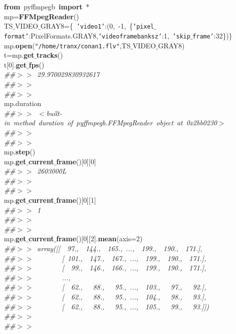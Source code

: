\noindent
\mbox{}\textbf{from}\ pyffmpegb\ \textbf{import}\ * \\
\mbox{}mp=\textbf{FFMpegReader}() \\
\mbox{}TS$\_$VIDEO$\_$GRAY8=\{\ \texttt{'video1'}:(0,\ -1,\ \{\texttt{'pixel$\_$format'}:PixelFormats.GRAY8,\texttt{'videoframebanksz'}:1,\ \texttt{'skip$\_$frame'}:32\})\} \\
\mbox{}mp.\textbf{open}(\texttt{"{}/home/tranx/conan1.flv"{}},TS$\_$VIDEO$\_$GRAY8) \\
\mbox{}t=mp.\textbf{get$\_$tracks}() \\
\mbox{}t[0].\textbf{get$\_$fps}() \\
\mbox{}\textit{\#\#$>$$>$\ 29.970029830932617} \\
\mbox{}\textit{\#\#$>$$>$\ } \\
\mbox{}\textit{\#\#$>$$>$\ } \\
\mbox{}mp.duration \\
\mbox{}\textit{\#\#$>$$>$\ $<$built-in\ method\ duration\ of\ pyffmpegb.FFMpegReader\ object\ at\ 0x2bb0230$>$} \\
\mbox{}\textit{\#\#$>$$>$\ } \\
\mbox{}\textit{\#\#$>$$>$\ } \\
\mbox{}mp.\textbf{step}() \\
\mbox{}mp.\textbf{get$\_$current$\_$frame}()[0][0] \\
\mbox{}\textit{\#\#$>$$>$\ 2603000L} \\
\mbox{}\textit{\#\#$>$$>$\ } \\
\mbox{}\textit{\#\#$>$$>$\ } \\
\mbox{}mp.\textbf{get$\_$current$\_$frame}()[0][1] \\
\mbox{}\textit{\#\#$>$$>$\ 1} \\
\mbox{}\textit{\#\#$>$$>$\ } \\
\mbox{}\textit{\#\#$>$$>$\ } \\
\mbox{}mp.\textbf{get$\_$current$\_$frame}()[0][2].\textbf{mean}(axis=2) \\
\mbox{}\textit{\#\#$>$$>$\ array([[\ \ 97.,\ \ 144.,\ \ 165.,\ ...,\ \ 199.,\ \ 190.,\ \ 171.],} \\
\mbox{}\textit{\#\#$>$$>$\ \ \ \ \ \ \ \ [\ 101.,\ \ 147.,\ \ 167.,\ ...,\ \ 199.,\ \ 190.,\ \ 171.],} \\
\mbox{}\textit{\#\#$>$$>$\ \ \ \ \ \ \ \ [\ \ 99.,\ \ 146.,\ \ 166.,\ ...,\ \ 199.,\ \ 190.,\ \ 171.],} \\
\mbox{}\textit{\#\#$>$$>$\ \ \ \ \ \ \ \ ...,\ } \\
\mbox{}\textit{\#\#$>$$>$\ \ \ \ \ \ \ \ [\ \ 62.,\ \ \ 88.,\ \ \ 95.,\ ...,\ \ 103.,\ \ \ 97.,\ \ \ 92.],} \\
\mbox{}\textit{\#\#$>$$>$\ \ \ \ \ \ \ \ [\ \ 62.,\ \ \ 88.,\ \ \ 95.,\ ...,\ \ 104.,\ \ \ 98.,\ \ \ 93.],} \\
\mbox{}\textit{\#\#$>$$>$\ \ \ \ \ \ \ \ [\ \ 62.,\ \ \ 88.,\ \ \ 95.,\ ...,\ \ 105.,\ \ \ 99.,\ \ \ 93.]])} \\
\mbox{}\textit{\#\#$>$$>$\ } \\
\mbox{}\textit{\#\#$>$$>$\ } \\
\mbox{} \\
\mbox{}